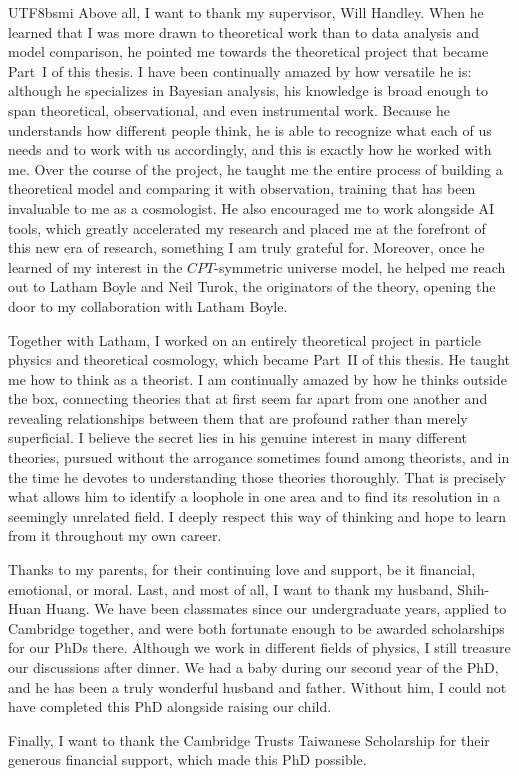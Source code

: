 \documentclass[12pt,a4paper]{report}
\begin{document}
\begin{CJK}{UTF8}{bsmi}
Above all, I want to thank my supervisor, Will Handley. When he learned that I was more drawn to theoretical work than to data analysis and model comparison, he pointed me towards the theoretical project that became Part~I of this thesis. I have been continually amazed by how versatile he is: although he specializes in Bayesian analysis, his knowledge is broad enough to span theoretical, observational, and even instrumental work. Because he understands how different people think, he is able to recognize what each of us needs and to work with us accordingly, and this is exactly how he worked with me. Over the course of the project, he taught me the entire process of building a theoretical model and comparing it with observation, training that has been invaluable to me as a cosmologist. He also encouraged me to work alongside AI tools, which greatly accelerated my research and placed me at the forefront of this new era of research, something I am truly grateful for. Moreover, once he learned of my interest in the $CPT$-symmetric universe model, he helped me reach out to Latham Boyle and Neil Turok, the originators of the theory, opening the door to my collaboration with Latham Boyle.

Together with Latham, I worked on an entirely theoretical project in particle physics and theoretical cosmology, which became Part~II of this thesis. He taught me how to think as a theorist. I am continually amazed by how he thinks outside the box, connecting theories that at first seem far apart from one another and revealing relationships between them that are profound rather than merely superficial. I believe the secret lies in his genuine interest in many different theories, pursued without the arrogance sometimes found among theorists, and in the time he devotes to understanding those theories thoroughly. That is precisely what allows him to identify a loophole in one area and to find its resolution in a seemingly unrelated field. I deeply respect this way of thinking and hope to learn from it throughout my own career.

Thanks to my parents, for their continuing love and support, be it financial, emotional, or moral. Last, and most of all, I want to thank my husband, Shih-Huan Huang. We have been classmates since our undergraduate years, applied to Cambridge together, and were both fortunate enough to be awarded scholarships for our PhDs there. Although we work in different fields of physics, I still treasure our discussions after dinner. We had a baby during our second year of the PhD, and he has been a truly wonderful husband and father. Without him, I could not have completed this PhD alongside raising our child.

Finally, I want to thank the Cambridge Trusts Taiwanese Scholarship for their generous financial support, which made this PhD possible.

\end{CJK}
\end{document}
